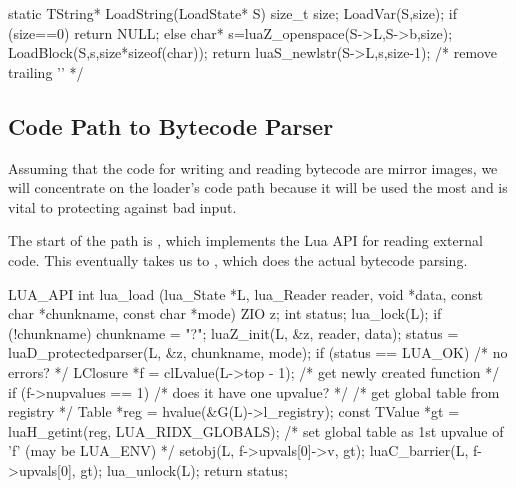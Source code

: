 \begin{LuaCCode}[caption=Definition of \func{LoadString} from \filename{lundump.c}]
static TString* LoadString(LoadState* S)
{
 size_t size;
 LoadVar(S,size);
 if (size==0)
  return NULL;
 else
 {
  char* s=luaZ_openspace(S->L,S->b,size);
  LoadBlock(S,s,size*sizeof(char));
  return luaS_newlstr(S->L,s,size-1);		/* remove trailing '\0' */
 }
}
\end{LuaCCode}


\subsection{Code Path to Bytecode Parser}

	Assuming that the code for writing and reading bytecode are mirror
	images, we will concentrate on the loader's code path because it will
	be used the most and is vital to protecting against bad input.

	The start of the path is , which implements the Lua
	 API for reading external code.  This eventually takes us to
	, which does the actual bytecode parsing.


\begin{LuaCCode}[caption=Definition of \func{lua\_load} from \filename{lapi.c}]
LUA_API int lua_load (lua_State *L, lua_Reader reader, void *data,
                      const char *chunkname, const char *mode) {
  ZIO z;
  int status;
  lua_lock(L);
  if (!chunkname) chunkname = "?";
  luaZ_init(L, &z, reader, data);
  status = luaD_protectedparser(L, &z, chunkname, mode);
  if (status == LUA_OK) {  /* no errors? */
    LClosure *f = clLvalue(L->top - 1);  /* get newly created function */
    if (f->nupvalues == 1) {  /* does it have one upvalue? */
      /* get global table from registry */
      Table *reg = hvalue(&G(L)->l_registry);
      const TValue *gt = luaH_getint(reg, LUA_RIDX_GLOBALS);
      /* set global table as 1st upvalue of 'f' (may be LUA_ENV) */
      setobj(L, f->upvals[0]->v, gt);
      luaC_barrier(L, f->upvals[0], gt);
    }
  }
  lua_unlock(L);
  return status;
}
\end{LuaCCode}


